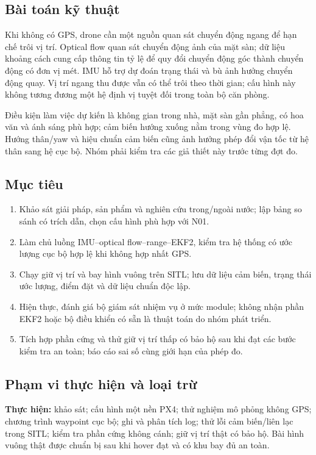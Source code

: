 \documentclass[a4paper,12pt]{article}
\begin{document}
\subsection{Bài toán kỹ thuật}
Khi không có GPS, drone cần một nguồn quan sát chuyển động ngang để hạn chế trôi vị trí. Optical flow quan sát chuyển động ảnh của mặt sàn; dữ liệu khoảng cách cung cấp thông tin tỷ lệ để quy đổi chuyển động góc thành chuyển động có đơn vị mét. IMU hỗ trợ dự đoán trạng thái và bù ảnh hưởng chuyển động quay\cite{flow,ekf}. Vị trí ngang thu được vẫn có thể trôi theo thời gian; cấu hình này không tương đương một hệ định vị tuyệt đối trong toàn bộ căn phòng.

Điều kiện làm việc dự kiến là không gian trong nhà, mặt sàn gần phẳng, có hoa văn và ánh sáng phù hợp; cảm biến hướng xuống nằm trong vùng đo hợp lệ. Hướng thân/yaw và hiệu chuẩn cảm biến cũng ảnh hưởng phép đổi vận tốc từ hệ thân sang hệ cục bộ. Nhóm phải kiểm tra các giả thiết này trước từng đợt đo.

\subsection{Mục tiêu}
\begin{enumerate}
\item Khảo sát giải pháp, sản phẩm và nghiên cứu trong/ngoài nước; lập bảng so sánh có trích dẫn, chọn cấu hình phù hợp với N01.
\item Làm chủ luồng IMU–optical flow–range–EKF2, kiểm tra hệ thống có ước lượng cục bộ hợp lệ khi không hợp nhất GPS.
\item Chạy giữ vị trí và bay hình vuông trên SITL; lưu dữ liệu cảm biến, trạng thái ước lượng, điểm đặt và dữ liệu chuẩn độc lập.
\item Hiện thực, đánh giá bộ giám sát nhiệm vụ ở mức module; không nhận phần EKF2 hoặc bộ điều khiển có sẵn là thuật toán do nhóm phát triển.
\item Tích hợp phần cứng và thử giữ vị trí thấp có bảo hộ sau khi đạt các bước kiểm tra an toàn; báo cáo sai số cùng giới hạn của phép đo.
\end{enumerate}

\subsection{Phạm vi thực hiện và loại trừ}
\textbf{Thực hiện:} khảo sát; cấu hình một nền PX4; thử nghiệm mô phỏng không GPS; chương trình waypoint cục bộ; ghi và phân tích log; thử lỗi cảm biến/liên lạc trong SITL; kiểm tra phần cứng không cánh; giữ vị trí thật có bảo hộ. Bài hình vuông thật được chuẩn bị sau khi hover đạt và có khu bay đủ an toàn.
\end{document}
